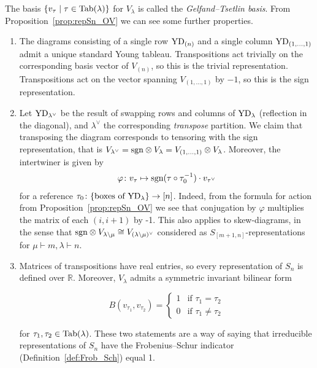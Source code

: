 \documentclass{amsart}
\newcommand{\tn}{\textnormal}
\begin{document}
The basis $\{v_\tau\mid\tau\in\tn{Tab}(\lambda)\}$ for $V_\lambda$ is called the \emph{Gelfand--Tsetlin basis}. From Proposition~\ref{prop:repSn_OV} we can see some further properties.
\begin{enumerate}
\item The diagrams consisting of a single row $\tn{YD}_{(n)}$ and a single column $\tn{YD}_{(1,\dots,1)}$ admit a unique standard Young tableau. Transpositions act trivially on the corresponding basis vector of $V_{(n)}$, so this is the trivial representation. Transpositions act on the vector spanning $V_{(1,\dots,1)}$ by $-1$, so this is the sign representation.
\item Let $\tn{YD}_{\lambda^\vee}$ be the result of swapping rows and columns of $\tn{YD}_\lambda$ (reflection in the diagonal), and $\lambda^\vee$ the corresponding \emph{transpose} partition. We claim that transposing the diagram corresponds to tensoring with the sign representation, that is $V_{\lambda^\vee}=\tn{sgn}\otimes V_\lambda=V_{(1,\dots,1)}\otimes V_\lambda$. Moreover, the intertwiner is given by
\begin{equation*}
\varphi\colon v_\tau\mapsto\tn{sgn}(\tau\circ\tau_0^{-1})\cdot v_{\tau^\vee}
\end{equation*}
for a reference $\tau_0\colon\{\text{boxes of }\tn{YD}_\lambda\}\to[n]$. Indeed, from the formula for action from Proposition~\ref{prop:repSn_OV} we see that conjugation by $\varphi$ multiplies the matrix of each $(i,i+1)$ by -1. This also applies to skew-diagrams, in the sense that $\tn{sgn}\otimes V_{\lambda\setminus\mu}\cong V_{(\lambda\setminus\mu)^\vee}$ considered as $S_{[m+1,n]}$-representations for $\mu\vdash m,\lambda\vdash n$.
\item Matrices of transpositions have real entries, so every representation of $S_n$ is defined over $\mathbb{R}$. Moreover, $V_\lambda$ admits a symmetric invariant bilinear form
\begin{minipage}{\textwidth}\begin{equation}\label{eq:repSn_bilinear_form}
B(v_{\tau_1},v_{\tau_2})=\begin{cases}1&\text{if }\tau_1=\tau_2\\0&\text{if }\tau_1\neq\tau_2\end{cases}
\end{equation}\end{minipage}
for $\tau_1,\tau_2\in\tn{Tab}(\lambda)$. These two statements are a way of saying that irreducible representations of $S_n$ have the Frobenius--Schur indicator (Definition~\ref{def:Frob_Sch}) equal 1.

\end{enumerate}
\end{document}
